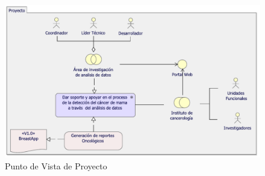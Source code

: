 \begin{figure}[h!]
	\centering
	\includegraphics[width=1\linewidth]{ARQUITECTURA/imgs/CapaImplementacion/1_PvProyecto}
	\caption{Punto de Vista de Proyecto}
	\label{PvProyecto}
\end{figure}

